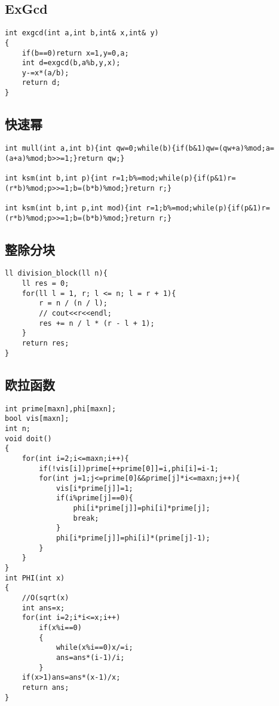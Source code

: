 \documentclass[12pt, a4paper, oneside]{ctexart}
\begin{document}
\subsection{ExGcd} 
\begin{lstlisting}
int exgcd(int a,int b,int& x,int& y)
{
	if(b==0)return x=1,y=0,a;
	int d=exgcd(b,a%b,y,x);
	y-=x*(a/b);
	return d;
}
\end{lstlisting}




\subsection{快速幂} 
\begin{lstlisting}
int mull(int a,int b){int qw=0;while(b){if(b&1)qw=(qw+a)%mod;a=(a+a)%mod;b>>=1;}return qw;}

int ksm(int b,int p){int r=1;b%=mod;while(p){if(p&1)r=(r*b)%mod;p>>=1;b=(b*b)%mod;}return r;}

int ksm(int b,int p,int mod){int r=1;b%=mod;while(p){if(p&1)r=(r*b)%mod;p>>=1;b=(b*b)%mod;}return r;}

\end{lstlisting}




\subsection{整除分块} 
\begin{lstlisting}
ll division_block(ll n){
	ll res = 0;
	for(ll l = 1, r; l <= n; l = r + 1){
		r = n / (n / l);
		// cout<<r<<endl;
		res += n / l * (r - l + 1);
	}
	return res;
}
\end{lstlisting}




\subsection{欧拉函数} 
\begin{lstlisting}
int prime[maxn],phi[maxn];
bool vis[maxn];
int n;
void doit()
{
	for(int i=2;i<=maxn;i++){
		if(!vis[i])prime[++prime[0]]=i,phi[i]=i-1;
		for(int j=1;j<=prime[0]&&prime[j]*i<=maxn;j++){
			vis[i*prime[j]]=1;
			if(i%prime[j]==0){
				phi[i*prime[j]]=phi[i]*prime[j];
				break;
			}
			phi[i*prime[j]]=phi[i]*(prime[j]-1);
		}
	}
}
int PHI(int x)
{
	//O(sqrt(x)
	int ans=x;
	for(int i=2;i*i<=x;i++)
		if(x%i==0)
		{
			while(x%i==0)x/=i;
			ans=ans*(i-1)/i;
		}
	if(x>1)ans=ans*(x-1)/x;
	return ans;
}
\end{lstlisting}
\end{document}
